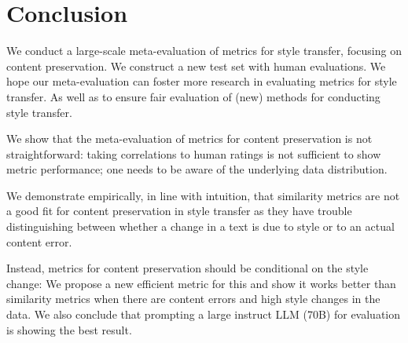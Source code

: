 \section{Conclusion}
We conduct a large-scale meta-evaluation of metrics for style transfer, focusing on content preservation. We construct a new test set with human evaluations. We hope our meta-evaluation can foster more research in evaluating metrics for style transfer. As well as to ensure fair evaluation of (new) methods for conducting style transfer. 

We show that the meta-evaluation of metrics for content preservation is not straightforward: taking correlations to human ratings is not sufficient to show metric performance; one needs to be aware of the underlying data distribution.

We demonstrate empirically, in line with intuition, that similarity metrics are not a good fit for content preservation in style transfer as they have trouble distinguishing between whether a change in a text is due to style or to an actual content error.

 Instead, metrics for content preservation should be conditional on the style change: We propose a new efficient metric for this and show it works better than similarity metrics when there are content errors and high style changes in the data. We also conclude that prompting a large instruct LLM (70B) for evaluation is showing the best result. 